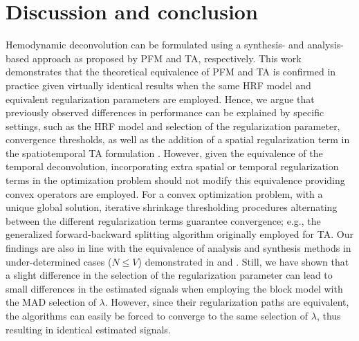 
\section{Discussion and conclusion}

Hemodynamic deconvolution can be formulated using a synthesis- and
analysis-based approach as proposed by PFM and TA, respectively. This work
demonstrates that the theoretical equivalence of PFM and TA is confirmed in
practice given virtually identical results when the same HRF model and
equivalent regularization parameters are employed. Hence, we argue that
previously observed differences in performance can be explained by specific
settings, such as the HRF model and selection of the regularization parameter,
convergence thresholds, as well as the addition of a spatial regularization term
in the spatiotemporal TA formulation
\citep{Karahanoglu2013TotalactivationfMRI}. However, given the equivalence
of the temporal deconvolution, incorporating extra spatial or temporal
regularization terms in the optimization problem should not modify this
equivalence providing convex operators are employed. For a convex optimization
problem, with a unique global solution, iterative shrinkage thresholding
procedures alternating between the different regularization terms guarantee
convergence; e.g., the generalized forward-backward splitting
\citep{Raguet2013GeneralizedForwardBackward} algorithm originally employed
for TA. Our findings are also in line with the equivalence of analysis and
synthesis methods in under-determined cases (\(N \leq V\)) demonstrated in
\citep{Elad2007Analysisversussynthesis} and
\citep{ortelli2019synthesis}. Still, we have shown that a slight difference
in the selection of the regularization parameter can lead to small differences
in the estimated signals when employing the block model with the MAD selection
of $\lambda$. However, since their regularization paths are equivalent, the
algorithms can easily be forced to converge to the same selection of $\lambda$,
thus resulting in identical estimated signals.

